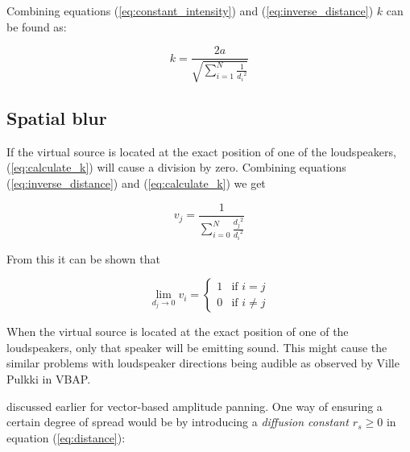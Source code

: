 \documentclass[twoside,10pt]{article}
\begin{document}

Combining equations (\ref{eq:constant_intensity}) and (\ref{eq:inverse_distance}) $k$ can be found as:

\begin{equation} \label{eq:calculate_k}
k = \frac{2a}{\sqrt{\sum_{i=1}^{N} \frac{1}{{d_{i}}^2}}}
\end{equation}




\subsection{Spatial blur}

If the virtual source is located at the exact position of one of the loudspeakers, (\ref{eq:calculate_k}) will cause a division by zero. Combining equations (\ref{eq:inverse_distance}) and (\ref{eq:calculate_k}) we get

\begin{equation}
v_{j} = \frac{1}{\sum_{i=0}^{N} \frac{{d_{j}}^2}{{d_{i}}^2}}
\end{equation}

From this it can be shown that

\begin{equation} \label{eq:distance_zero}
\lim_{d_{j} \rightarrow 0} v_{i} = 
\left\{ \begin{array}{ll} 
1 & \textrm{if $i=j$}\\ 
0 & \textrm{if $i \ne j$}
\end{array} \right.
\end{equation}

When the virtual source is located at the exact position of one of the loudspeakers, only that speaker will be emitting sound. This might cause the similar problems with loudspeaker directions being audible as observed by Ville Pulkki in VBAP.





 discussed earlier for vector-based amplitude panning. One way of ensuring a certain degree of spread would be by introducing a \textit{diffusion constant $r_{s} \ge 0$} in equation (\ref{eq:distance}):
\end{document}
